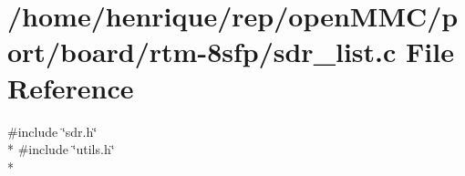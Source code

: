 \hypertarget{port_2board_2rtm-8sfp_2sdr__list_8c}{\section{/home/henrique/rep/open\-M\-M\-C/port/board/rtm-\/8sfp/sdr\-\_\-list.c File Reference}
\label{port_2board_2rtm-8sfp_2sdr__list_8c}
}
{\ttfamily \#include \char`\"{}sdr.\-h\char`\"{}}\\*
{\ttfamily \#include \char`\"{}utils.\-h\char`\"{}}\\*
